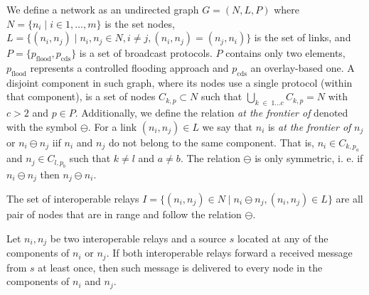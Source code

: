 %
We define a network as an undirected graph $ G = (N, L, P) $ where $ N = \{ n_{i} \mid i \in 1, \dots, m \} $ is the set nodes, $ L = \{ (n_{i}, n_{j}) \mid n_{i}, n_{j} \in N, i \neq j, (n_{i}, n_{j}) = (n_{j}, n_{i}) \} $ is the set of links, and $ P = \{p_{\text{flood}}, p_{\text{cds}} \} $ is a set of broadcast protocols.
%
$P$ contains only two elements, $p_{\text{flood}}$ represents a controlled flooding approach and $p_{\text{cds}}$ an overlay-based one.
%
A disjoint component in such graph, where its nodes use a single protocol (within that component), is a set of nodes $ C_{k, p} \subset N $ such that $\bigcup\limits_{k \; \in \; 1 \dots c} C_{k, p} = N $ with $ c > 2 $ and $ p \in P $.
%
Additionally, we define the relation \emph{at the frontier of} denoted with the symbol $ \ominus $.
%
For a link $ (n_{i}, n_{j})\in L $ we say that $ n_{i} $ is \emph{at the frontier of} $ n_{j} $ or $ n_{i} \ominus n_{j} $ iif $n_i$ and $n_j$ do not belong to the same component.
%
That is, $ n_{i} \in C_{k, p_{a}} $ and $ n_{j} \in C_{l, p_{b}} $ such that $ k \neq l$ and  $a \neq b $.
%
%
The relation $\ominus$ is only symmetric, i. e. if $ n_{i} \ominus n_{j} $ then $ n_{j} \ominus n_{i} $. 
%
%
\begin{definition}
The set of interoperable relays $ I = \{ (n_{i}, n_{j}) \in N \mid n_{i} \ominus n_{j}, (n_{i}, n_{j}) \in L \} $ are all pair of nodes that are in range and follow the relation $\ominus$.
\end{definition}
%
\begin{theorem}
Let $ n_{i}, n_{j} $ be two interoperable relays and a source $s$ located at any of the components of $ n_{i} $ or $ n_{j} $.
%
If both interoperable relays forward a received message from $s$ at least once, then such message is delivered to every node in the components of $ n_{i} $ and $ n_{j} $.
\end{theorem}
